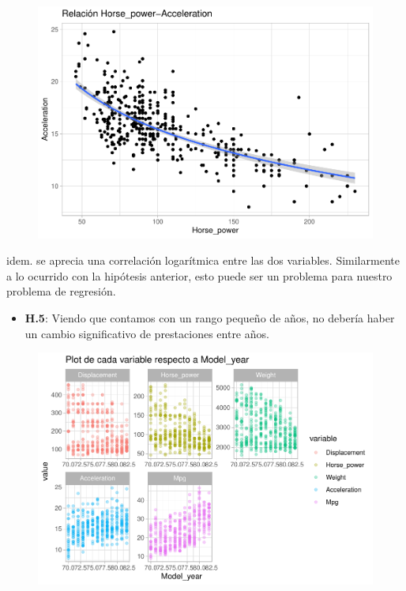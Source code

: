 \begin{figure}[H]\includegraphics[width=.9\linewidth]{img/EDA_files/figure-latex/unnamed-chunk-28-1} \caption{}\end{figure}

idem. se aprecia una correlación logarítmica entre las dos variables. Similarmente a lo ocurrido con la hipótesis anterior, esto puede ser un problema para nuestro problema de regresión.

\begin{itemize}
\item \textbf{H.5}: Viendo que contamos con un rango pequeño de años, no debería haber un cambio significativo de prestaciones entre años.
\end{itemize}

\begin{figure}[H]\includegraphics[width=.9\linewidth]{img/EDA_files/figure-latex/unnamed-chunk-29-1} \caption{}\end{figure}

